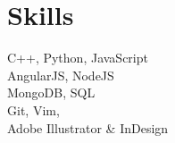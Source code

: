 \section{Skills}
C++, Python, JavaScript\\ 

AngularJS, NodeJS \\

MongoDB, SQL \\

Git, Vim, \\
Adobe Illustrator \& InDesign \\ 

\sectionsep